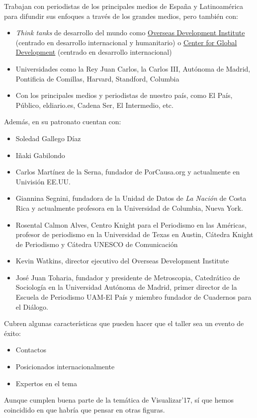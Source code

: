 \documentclass[11pt]{article}
\begin{document}
Trabajan con periodistas de los principales medios de España y Latinoamérica para difundir sus enfoques a través de los grandes medios, pero también con:

\begin{itemize}
\item \emph{Think tanks} de desarrollo del mundo como \href{https://www.odi.org/}{Overseas Development Institute} (centrado en desarrollo internacional y humanitario) o \href{https://www.cgdev.org/}{Center for Global Development} (centrado en desarrollo internacional)
\item Universidades como la Rey Juan Carlos, la Carlos III, Autónoma de Madrid, Pontificia de Comillas, Harvard, Standford, Columbia
\item Con los principales medios y periodistas de nuestro país, como El País, Público, eldiario.es, Cadena Ser, El Intermedio, etc.
\end{itemize}

Además, en su patronato cuentan con:
\begin{itemize}
\item Soledad Gallego Díaz
\item Iñaki Gabilondo
\item Carlos Martínez de la Serna, fundador de PorCausa.org y actualmente en Univisión EE.UU.
\item Giannina Segnini, fundadora de la Unidad de Datos de \emph{La Nación} de Costa Rica y actualmente profesora en la Universidad de Columbia, Nueva York.
\item Rosental Calmon Alves, Centro Knight para el Periodismo en las Américas, profesor de periodismo en la Universidad de Texas en Austin, Cátedra Knight de Periodismo y Cátedra UNESCO de Comunicación
\item Kevin Watkins, director ejecutivo del Overseas Development Institute
\item José Juan Toharia, fundador y presidente de Metroscopia, Catedrático de Sociología en la Universidad Autónoma de Madrid, primer director de la Escuela de Periodismo UAM-El País y miembro fundador de Cuadernos para el Diálogo.
\end{itemize}

Cubren algunas características que pueden hacer que el taller sea un evento de éxito:
\begin{itemize}
\item Contactos
\item Posicionados internacionalmente
\item Expertos en el tema
\end{itemize}

Aunque cumplen buena parte de la temática de Visualizar'17, sí que hemos coincidido en que habría que pensar en otras figuras.
\end{document}
